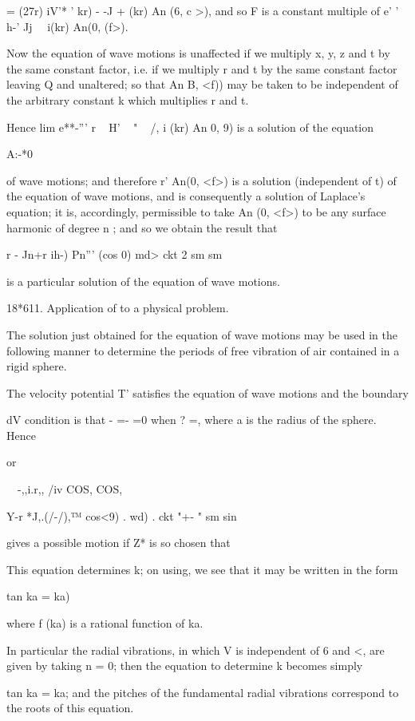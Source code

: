 = (27r) iV'* ' kr) - -J + (kr) An (6, c >), and so F is a constant
multiple of e' ' h-' Jj \ \ i(kr) An(0, (f>).

Now the equation of wave motions is unaffected if we multiply x, y, z
and t by the same constant factor, i.e. if we multiply r and t by the
same constant factor leaving Q and unaltered; so that An B, <f)) may
be taken to be independent of the arbitrary constant k which
multiplies r and t.

Hence lim e**-''' r ~ H' ~ " ~ /, i (kr) An 0, 9) is a solution of
the equation

A:-*0

of wave motions; and therefore r' An(0, <f>) is a solution
(independent of t) of the equation of wave motions, and is
consequently a solution of Laplace's equation; it is, accordingly,
permissible to take An (0, <f>) to be any surface harmonic of degree n
; and so we obtain the result that

r - Jn+r ih-) Pn''' (cos 0) md> ckt 2 sm sm

is a particular solution of the equation of wave motions.

%
%

18*611. Application of to a physical problem.

The solution just obtained for the equation of wave motions may be
used in the following manner to determine the periods of free
vibration of air contained in a rigid sphere.

The velocity potential T' satisfies the equation of wave motions and
the boundary

dV condition is that - =- =0 when ? =, where a is the radius of the
sphere. Hence

or

~\ -,,i.r,, /iv COS, COS,

Y-r *J,.(/-/),™ cos<9) . wd) . ckt "+- " sm sin

gives a possible motion if Z* is so chosen that

This equation determines k; on using, we see that it may be
written in the form

tan ka = ka)

where f (ka) is a rational function of ka.

In particular the radial vibrations, in which V is independent of 6
and <, are given by taking n = 0; then the equation to determine k
becomes simply

tan ka = ka; and the pitches of the fundamental radial vibrations
correspond to the roots of this equation.

